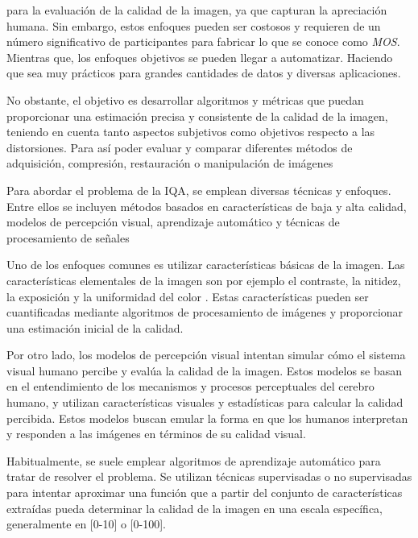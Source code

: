 para la evaluación de la calidad de la imagen, ya que capturan la apreciación 
humana. Sin embargo, estos enfoques pueden ser costosos y requieren de un número 
significativo de participantes para fabricar lo que se conoce como \emph{MOS}\footnotemark[1]. 
Mientras que, los enfoques objetivos se pueden llegar a automatizar. Haciendo que 
sea muy prácticos para grandes cantidades de datos y diversas aplicaciones.
\par 
No obstante, el objetivo es desarrollar algoritmos y métricas que puedan proporcionar una 
estimación precisa y consistente de la calidad de la imagen, teniendo en cuenta
tanto aspectos subjetivos como objetivos respecto a las distorsiones.
Para así poder evaluar y comparar diferentes métodos de adquisición, compresión, 
restauración o manipulación de imágenes
\par 
Para abordar el problema de la IQA, se emplean diversas técnicas y enfoques. 
Entre ellos se incluyen métodos basados en características de baja y alta calidad,
modelos de percepción visual, aprendizaje automático y técnicas de procesamiento de señales
\par 
Uno de los enfoques comunes es utilizar características básicas de la imagen. 
Las características elementales de la imagen son por ejemplo el contraste, 
la nitidez, la exposición y la uniformidad del color . 
Estas características pueden ser cuantificadas mediante algoritmos de procesamiento de 
imágenes y proporcionar una estimación inicial de la calidad. 
\par 
Por otro lado, los modelos de percepción visual intentan simular cómo el sistema 
visual humano percibe y evalúa la calidad de la imagen. Estos modelos se basan 
en el entendimiento de los mecanismos y procesos perceptuales del cerebro humano, 
y utilizan características visuales y estadísticas para calcular la calidad percibida. 
Estos modelos buscan emular la forma en que los humanos interpretan y responden 
a las imágenes en términos de su calidad visual.
\par 
Habitualmente, se suele emplear algoritmos de aprendizaje automático para tratar
de resolver el problema. Se utilizan técnicas supervisadas o no supervisadas 
para intentar aproximar una función que a partir del conjunto de características 
extraídas pueda determinar la calidad de la imagen en una escala específica, 
generalmente en [0-10] o [0-100].

